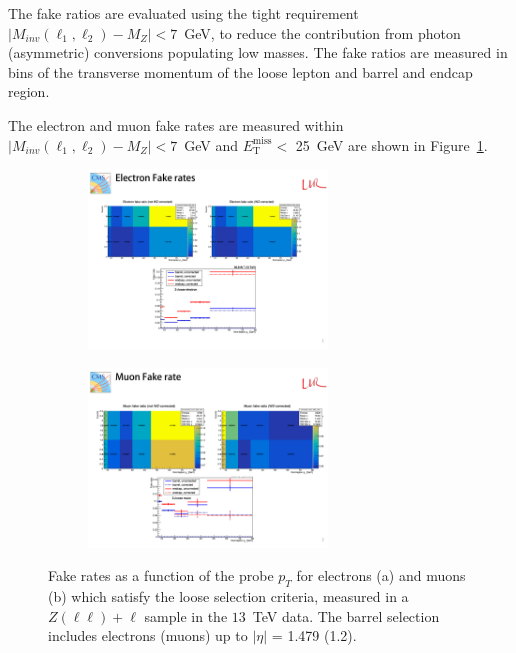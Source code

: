 The fake ratios are evaluated using the tight requirement 
$|M_{inv}(\ell_{1},\ell_{2}) - M_{Z}| < 7 $~GeV, to reduce the 
contribution from photon (asymmetric) conversions populating low masses. 
The fake ratios are measured in bins of the transverse momentum of the loose lepton and barrel and endcap region.

The electron and muon fake rates are measured within 
$|M_{inv}(\ell_{1},\ell_{2}) - M_{Z}| < 7 $~GeV and $E_{\mathrm{T}}^\text{miss}  < $ 25~GeV are 
shown in Figure~\ref{fig:os_fakerates}. 

\begin{figure}[tbh]
\centering
\begin{subfigure}{0.45\textwidth}
\centering
\includegraphics[width=2.5in]{Figures/RedBkg/FR_electrons_ptl3_DataallTR.pdf}
\caption{}
\end{subfigure}
\begin{subfigure}{0.45\textwidth}
\centering
\includegraphics[width=2.5in]{Figures/RedBkg/FR_muons_ptl3_DataallTR.pdf}
\caption{}
\end{subfigure}
  \caption{
Fake rates as a function of the probe $p_T$ for  electrons (a) and muons (b) which satisfy the loose selection criteria, measured in
a $Z(\ell\ell)+\ell$ sample in the $13$~TeV data.
The barrel selection includes electrons (muons) up to $|\eta|$ = 1.479 (1.2).
}
\label{fig:os_fakerates}
\end{figure}




